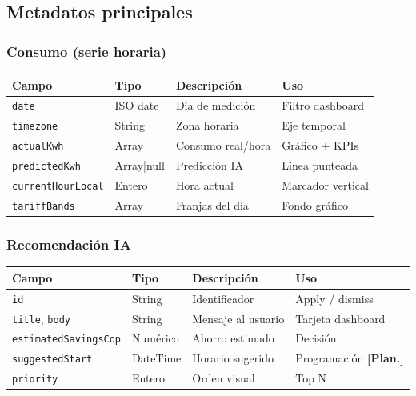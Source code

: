 \documentclass[11pt,a4paper]{article}
\newcommand{\stplan}{\textcolor{plan}{\textbf{[Plan.]}}}
\begin{document}
\subsection{Metadatos principales}

\subsubsection{Consumo (serie horaria)}

\begin{table}[H]
\centering
\scriptsize
\begin{tabularx}{\textwidth}{@{}L{2.6cm}L{2cm}L{4.5cm}Y@{}}
\toprule
\textbf{Campo} & \textbf{Tipo} & \textbf{Descripción} & \textbf{Uso} \\
\midrule
\texttt{date} & ISO date & Día de medición & Filtro dashboard \\
\texttt{timezone} & String & Zona horaria & Eje temporal \\
\texttt{actualKwh} & Array & Consumo real/hora & Gráfico + KPIs \\
\texttt{predictedKwh} & Array|null & Predicción IA & Línea punteada \\
\texttt{currentHourLocal} & Entero & Hora actual & Marcador vertical \\
\texttt{tariffBands} & Array & Franjas del día & Fondo gráfico \\
\bottomrule
\end{tabularx}
\end{table}

\subsubsection{Recomendación IA}

\begin{table}[H]
\centering
\scriptsize
\begin{tabularx}{\textwidth}{@{}L{2.8cm}L{2.2cm}L{4.2cm}Y@{}}
\toprule
\textbf{Campo} & \textbf{Tipo} & \textbf{Descripción} & \textbf{Uso} \\
\midrule
\texttt{id} & String & Identificador & Apply / dismiss \\
\texttt{title}, \texttt{body} & String & Mensaje al usuario & Tarjeta dashboard \\
\texttt{estimatedSavingsCop} & Numérico & Ahorro estimado & Decisión \\
\texttt{suggestedStart} & DateTime & Horario sugerido & Programación \stplan \\
\texttt{priority} & Entero & Orden visual & Top N \\
\bottomrule
\end{tabularx}
\end{table}
\end{document}
